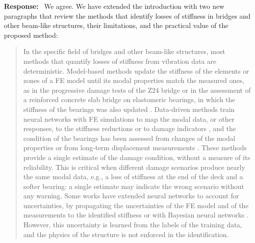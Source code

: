 \documentclass[11pt]{article}
\newenvironment{response}{\par\smallskip\noindent\color{resp}\textbf{Response:}\ }{\par}
\begin{document}
\begin{response}
We agree. We have extended the introduction with two new paragraphs that review the methods that identify losses of stiffness in bridges and other beam-like structures, their limitations, and the practical value of the proposed method:
\begin{quote}\small
In the specific field of bridges and other beam-like structures, most methods that quantify losses of stiffness from vibration data are deterministic.
Model-based methods update the stiffness of the elements or zones of a FE model until its modal properties match the measured ones, as in the progressive damage tests of the Z24 bridge \cite{teughels2004z24} or in the assessment of a reinforced concrete slab bridge on elastomeric bearings, in which the stiffness of the bearings was also updated \cite{elborgi2005modal}.
Data-driven methods train neural networks with FE simulations to map the modal data, or other responses, to the stiffness reductions \cite{lee2005neural,Jayasundara2020,AFN_SupervisedSHM,AFN_SupervisedEOCs} or to damage indicators \cite{sun2023deep}, and the condition of the bearings has been assessed from changes of the modal properties \cite{fayyadh2012condition} or from long-term displacement measurements \cite{garciasanchez2020bearing}.
These methods provide a single estimate of the damage condition, without a measure of its reliability.
This is critical when different damage scenarios produce nearly the same modal data, e.g., a loss of stiffness at the end of the deck and a softer bearing: a single estimate may indicate the wrong scenario without any warning.
Some works have extended neural networks to account for uncertainties, by propagating the uncertainties of the FE model and of the measurements to the identified stiffness \cite{bakhary2007damage} or with Bayesian neural networks \cite{yin2018probabilistic}.
However, this uncertainty is learned from the labels of the training data, and the physics of the structure is not enforced in the identification.


\end{quote}
\end{response}
\end{document}
